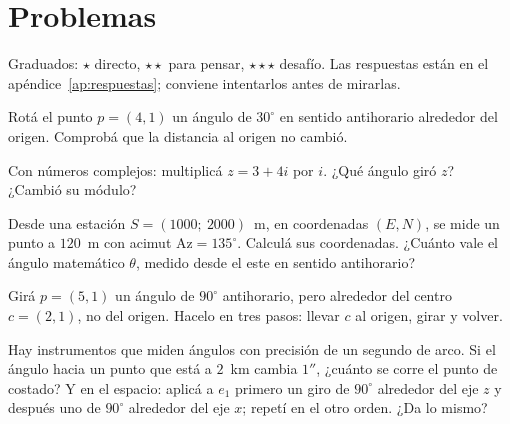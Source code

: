 \section{Problemas}\label{sec:problemas-01}

Graduados: \({\star}\) directo, \({\star}{\star}\) para pensar, \({\star}{\star}{\star}\) desafío. Las respuestas están en el apéndice~\ref{ap:respuestas}; conviene intentarlos antes de mirarlas.

\begin{problema}[\({\star}\)]\label{pb:01-1}
Rotá el punto \(p=(4,1)\) un ángulo de \(30^\circ\) en sentido antihorario alrededor del origen. Comprobá que la distancia al origen no cambió.
\end{problema}

\begin{problema}[\({\star}\)]\label{pb:01-2}
Con números complejos: multiplicá \(z=3+4i\) por \(i\). ¿Qué ángulo giró \(z\)? ¿Cambió su módulo?
\end{problema}

\begin{problema}[\({\star}{\star}\)]\label{pb:01-3}
Desde una estación \(S=(1000;\ 2000)\)~m, en coordenadas \((E,N)\), se mide un punto a \(120\)~m con acimut \(\mathrm{Az}=135^\circ\). Calculá sus coordenadas. ¿Cuánto vale el ángulo matemático \(\theta\), medido desde el este en sentido antihorario?
\end{problema}

\begin{problema}[\({\star}{\star}\)]\label{pb:01-4}
Girá \(p=(5,1)\) un ángulo de \(90^\circ\) antihorario, pero alrededor del centro \(c=(2,1)\), no del origen. Hacelo en tres pasos: llevar \(c\) al origen, girar y volver.
\end{problema}

\begin{problema}[\({\star}{\star}{\star}\)]\label{pb:01-5}
Hay instrumentos que miden ángulos con precisión de un segundo de arco. Si el ángulo hacia un punto que está a \(2\)~km cambia \(1''\), ¿cuánto se corre el punto de costado? Y en el espacio: aplicá a \(e_1\) primero un giro de \(90^\circ\) alrededor del eje \(z\) y después uno de \(90^\circ\) alrededor del eje \(x\); repetí en el otro orden. ¿Da lo mismo?
\end{problema}
